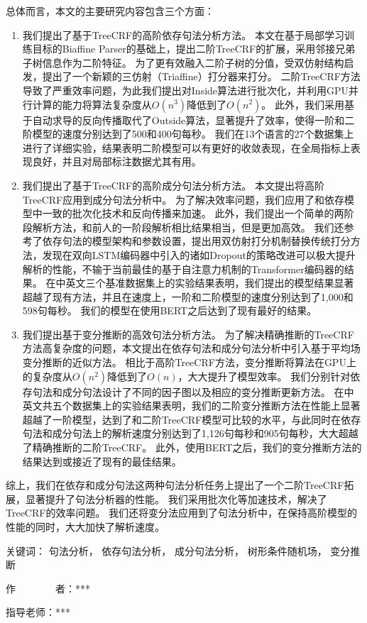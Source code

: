 \begin{cabstract}
	总体而言，本文的主要研究内容包含三个方面：
	\begin{enumerate}
		\item 我们提出了基于TreeCRF的高阶依存句法分析方法。
		      本文在基于局部学习训练目标的Biaffine Parser的基础上，提出二阶TreeCRF的扩展，采用邻接兄弟子树信息作为二阶特征。
		      为了更有效融入二阶子树的分值，受双仿射结构启发，提出了一个新颖的三仿射（Triaffine）打分器来打分。
		      二阶TreeCRF方法导致了严重效率问题，为此我们提出对Inside算法进行批次化，并利用GPU并行计算的能力将算法复杂度从$O(n^3)$降低到了$O(n^2)$。
		      此外，我们采用基于自动求导的反向传播取代了Outside算法，显著提升了效率，使得一阶和二阶模型的速度分别达到了500和400句每秒。
		      我们在13个语言的27个数据集上进行了详细实验，结果表明二阶模型可以有更好的收敛表现，在全局指标上表现良好，并且对局部标注数据尤其有用。
		\item 我们提出了基于TreeCRF的高阶成分句法分析方法。
		      本文提出将高阶TreeCRF应用到成分句法分析中。
		      为了解决效率问题，我们应用了和依存模型中一致的批次化技术和反向传播来加速。
		      此外，我们提出一个简单的两阶段解析方法，和前人的一阶段解析相比结果相当，但是更加高效。
		      我们还参考了依存句法的模型架构和参数设置，提出用双仿射打分机制替换传统打分方法，发现在双向LSTM编码器中引入的诸如Dropout的策略改进可以极大提升解析的性能，不输于当前最佳的基于自注意力机制的Transformer编码器的结果。
		      在中英文三个基准数据集上的实验结果表明，我们提出的模型结果显著超越了现有方法，并且在速度上，一阶和二阶模型的速度分别达到了1,000和598句每秒。
		      我们的模型在使用BERT之后达到了现有最好的结果。
		\item 我们提出基于变分推断的高效句法分析方法。
		      为了解决精确推断的TreeCRF方法高复杂度的问题，本文提出在依存句法和成分句法分析中引入基于平均场变分推断的近似方法。
		      相比于高阶TreeCRF方法，变分推断将算法在GPU上的复杂度从$O(n^2)$降低到了$O(n)$，大大提升了模型效率。
		      我们分别针对依存句法和成分句法设计了不同的因子图以及相应的变分推断更新方法。
		      在中英文共五个数据集上的实验结果表明，我们的二阶变分推断方法在性能上显著超越了一阶模型，达到了和二阶TreeCRF模型可比较的水平，与此同时在依存句法和成分句法上的解析速度分别达到了1,126句每秒和905句每秒，大大超越了精确推断的二阶TreeCRF。
		      此外，使用BERT之后，我们的变分推断方法的结果达到或接近了现有的最佳结果。
	\end{enumerate}
	
	综上，我们在依存和成分句法这两种句法分析任务上提出了一个二阶TreeCRF拓展，显著提升了句法分析器的性能。
	我们采用批次化等加速技术，解决了TreeCRF的效率问题。
	我们还将变分法应用到了句法分析中，在保持高阶模型的性能的同时，大大加快了解析速度。
	
	\vskip 21bp
	{\heiti{} 关键词：}
	句法分析，
	依存句法分析，
	成分句法分析，
	树形条件随机场，
	变分推断
	
	\begin{flushright}
		作~~~~~~~~者：***
		
		指导老师：***
		
	\end{flushright}
\end{cabstract}


